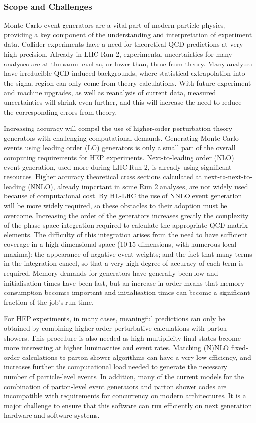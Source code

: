 \subsubsection*{Scope and Challenges}

Monte-Carlo event generators are a vital part of modern particle
physics, providing a key component of the understanding and
interpretation of experiment data. Collider experiments have a need for
theoretical QCD predictions at very high precision. Already in LHC Run
2, experimental uncertainties for many analyses are at the same level as,
or lower than, those from theory. Many analyses have irreducible
QCD-induced backgrounds, where statistical extrapolation into the signal
region can only come from theory calculations. With future experiment
and machine upgrades, as well as reanalysis of current data, measured
uncertainties will shrink even further, and this will increase the need
to reduce the corresponding errors from theory.

Increasing accuracy will compel the use of higher-order perturbation
theory generators with challenging computational demands. Generating
Monte Carlo events using leading order (LO) generators is only a small
part of the overall computing requirements for HEP experiments.
Next-to-leading order (NLO) event generation, used more during LHC Run
2, is already using significant resources. Higher accuracy
theoretical cross sections calculated at next-to-next-to-leading (NNLO),
already important in some Run 2 analyses, are not widely used
because of computational cost. By HL-LHC the use of NNLO event
generation will be more widely required, so these obstacles to their
adoption must be overcome.
Increasing the order of the generators increases greatly the complexity
of the phase space integration required to calculate the appropriate QCD
matrix elements. The difficulty of this integration arises from the need
to have sufficient coverage in a high-dimensional space (10-15
dimensions, with numerous local maxima); the appearance of negative event
weights; and the fact that many terms in the integration cancel, so that
a very high degree of accuracy of each term is required. Memory demands
for generators have generally been low and initialisation times have
been fast, but an increase in order means that memory consumption
becomes important and initialisation times can become a significant 
fraction of the job's run time.

For HEP experiments, in many cases, meaningful predictions can only be
obtained by combining higher-order perturbative calculations with parton
showers. This procedure is also needed as high-multiplicity final states
become more interesting at higher luminosities and event rates. Matching
(N)NLO fixed-order calculations to parton shower algorithms can have a
very low efficiency, and increases further the computational load needed
to generate the necessary number of particle-level events. In addition,
many of the current models for the combination of parton-level event
generators and parton shower codes are incompatible with requirements
for concurrency on modern architectures. It is a major challenge to
ensure that this software can run efficiently on next generation
hardware and software systems.

